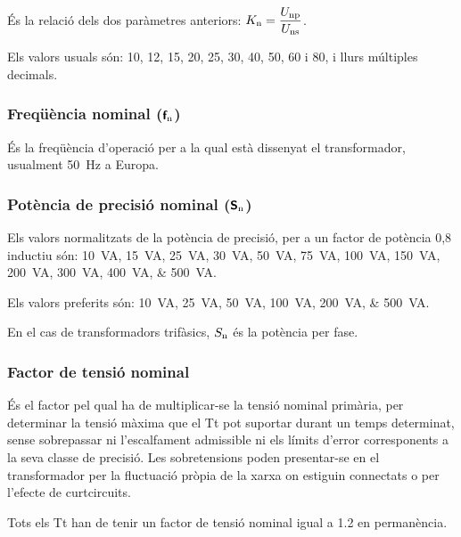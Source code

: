  És la relació  dels dos paràmetres anteriors: $K_\mathrm{n} = \dfrac{U_\mathrm{np}}{U_\mathrm{ns}}$.

 Els valors usuals són: 10, 12, 15, 20, 25, 30, 40, 50, 60 i 80, i llurs múltiples decimals.

\subsubsection{Freqüència nominal (${\boldsymbol{\mathsf{f_\text{n}}}}$)}

 És la freqüència d'operació per a la qual  està dissenyat el transformador, usualment \qty{50}{Hz} a Europa.

\subsubsection{Potència de precisió nominal (${\boldsymbol{\mathsf{S_\text{n}}}}$)}

Els valors normalitzats de la potència de precisió, per
a un factor de potència 0,8 inductiu són: \qtylist{10; 15; 25; 30; 50; 75; 100; 150;
 200; 300; 400; 500}{VA}.

 Els valors preferits són: \qtylist{10; 25; 50; 100; 200; 500}{VA}.

En el cas de transformadors trifàsics, $S_\mathrm{n}$ és la potència per fase.

\subsubsection{Factor de tensió nominal}

 És el factor pel qual ha de
multiplicar-se la tensió nominal primària, per  determinar la
tensió màxima que el Tt pot suportar durant un temps determinat,
sense sobrepassar ni l'escalfament admissible ni els límits d'error
corresponents a la seva classe de precisió. Les sobretensions poden
presentar-se en el transformador  per la fluctuació
pròpia de la xarxa on estiguin connectats o per l'efecte de curtcircuits.

Tots els  Tt han de tenir un factor de tensió nominal igual a \num{1,2} en permanència.

